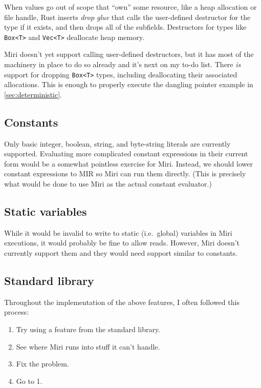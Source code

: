\documentclass[twocolumn]{article}
\newcommand{\rust}[1]{\texttt{#1}}
\begin{document}
When values go out of scope that ``own'' some resource, like a heap allocation or file handle, Rust
inserts \emph{drop glue} that calls the user-defined destructor for the type if it exists, and then
drops all of the subfields. Destructors for types like \rust{Box<T>} and \rust{Vec<T>} deallocate
heap memory.

Miri doesn't yet support calling user-defined destructors, but it has most of the machinery in place
to do so already and it's next on my to-do list. There \emph{is} support for dropping \rust{Box<T>}
types, including deallocating their associated allocations. This is enough to properly execute the
dangling pointer example in \autoref{sec:deterministic}.

\subsection{Constants}

Only basic integer, boolean, string, and byte-string literals are currently supported. Evaluating
more complicated constant expressions in their current form would be a somewhat pointless exercise
for Miri. Instead, we should lower constant expressions to MIR so Miri can run them directly. (This
is precisely what would be done to use Miri as the actual constant evaluator.)

\subsection{Static variables}

While it would be invalid to write to static (i.e.\ global) variables in Miri executions, it would
probably be fine to allow reads. However, Miri doesn't currently support them and they would need
support similar to constants.

\subsection{Standard library}

Throughout the implementation of the above features, I often followed this process:

\begin{enumerate}
  \item Try using a feature from the standard library.
  \item See where Miri runs into stuff it can't handle.
  \item Fix the problem.
  \item Go to 1.
\end{enumerate}
\end{document}
